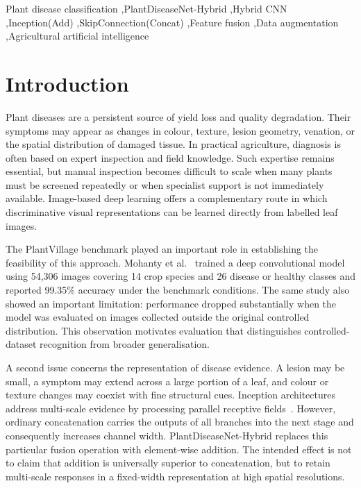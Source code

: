 \documentclass[a4paper,fleqn]{cas-dc}
\begin{document}
\begin{keywords}
Plant disease classification \sep PlantDiseaseNet-Hybrid \sep Hybrid CNN \sep Inception(Add) \sep SkipConnection(Concat) \sep Feature fusion \sep Data augmentation \sep Agricultural artificial intelligence
\end{keywords}

\maketitle

\section{Introduction}
Plant diseases are a persistent source of yield loss and quality degradation. Their symptoms may appear as changes in colour, texture, lesion geometry, venation, or the spatial distribution of damaged tissue. In practical agriculture, diagnosis is often based on expert inspection and field knowledge. Such expertise remains essential, but manual inspection becomes difficult to scale when many plants must be screened repeatedly or when specialist support is not immediately available. Image-based deep learning offers a complementary route in which discriminative visual representations can be learned directly from labelled leaf images.

The PlantVillage benchmark played an important role in establishing the feasibility of this approach. Mohanty et al.~\citep{mohanty2016} trained a deep convolutional model using 54,306 images covering 14 crop species and 26 disease or healthy classes and reported 99.35\% accuracy under the benchmark conditions. The same study also showed an important limitation: performance dropped substantially when the model was evaluated on images collected outside the original controlled distribution. This observation motivates evaluation that distinguishes controlled-dataset recognition from broader generalisation.

A second issue concerns the representation of disease evidence. A lesion may be small, a symptom may extend across a large portion of a leaf, and colour or texture changes may coexist with fine structural cues. Inception architectures address multi-scale evidence by processing parallel receptive fields~\citep{szegedy2015}. However, ordinary concatenation carries the outputs of all branches into the next stage and consequently increases channel width. PlantDiseaseNet-Hybrid replaces this particular fusion operation with element-wise addition. The intended effect is not to claim that addition is universally superior to concatenation, but to retain multi-scale responses in a fixed-width representation at high spatial resolutions.
\end{document}
